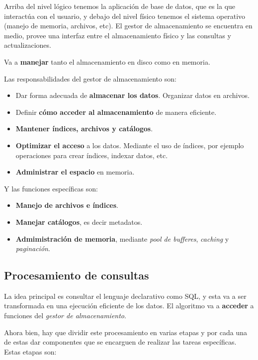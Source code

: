 \begin{tcolorbox}[colback=white,colframe=red,sharp corners]

Arriba del nivel lógico tenemos la aplicación de base de datos, que es la que interactúa con el usuario, y debajo del nivel físico tenemos el sistema operativo (manejo de memoria, archivos, etc). El gestor de almacenamiento se encuentra en medio, provee una interfaz entre el almacenamiento físico y las consultas y actualizaciones.

Va a \textbf{manejar} tanto el almacenamiento en disco como en memoria.

Las responsabilidades del gestor de almacenamiento son:
\begin{itemize}
    \item Dar forma adecuada de \textbf{almacenar los datos}. Organizar datos en archivos.
    \item Definir \textbf{cómo acceder al almacenamiento} de manera eficiente.
    \item \textbf{Mantener índices, archivos y catálogos}.
    \item \textbf{Optimizar el acceso} a los datos. Mediante el uso de índices, por ejemplo operaciones para crear índices, indexar datos, etc.
    \item \textbf{Administrar el espacio} en memoria.
\end{itemize}

Y las funciones específicas son:
\begin{itemize}
    \item \textbf{Manejo de archivos e índices}.
    \item \textbf{Manejar catálogos}, es decir metadatos.
    \item \textbf{Admimistración de memoria}, mediante \textit{pool de bufferes}, \textit{caching} y \textit{paginación}.
\end{itemize}

\end{tcolorbox}

\subsection{Procesamiento de consultas}

La idea principal es consultar el lenguaje declarativo como SQL, y esta va a ser transformada en una ejecución eficiente de los datos. El algoritmo va a \textbf{acceder} a funciones del \textit{gestor de almacenamiento}.

Ahora bien, hay que dividir este procesamiento en varias etapas y por cada una de estas dar componentes que se encarguen de realizar las tareas específicas. Estas etapas son:

